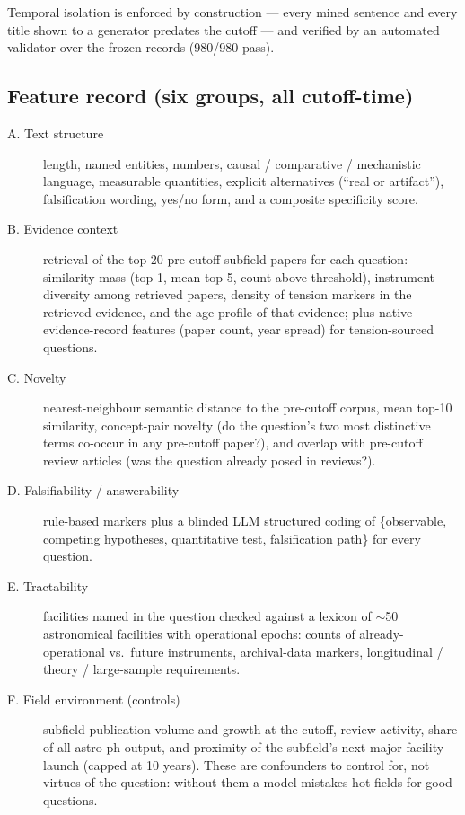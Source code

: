 \documentclass[11pt]{article}
\begin{document}
Temporal isolation is enforced by construction --- every mined sentence
and every title shown to a generator predates the cutoff --- and verified
by an automated validator over the frozen records (980/980 pass).

\subsection{Feature record (six groups, all cutoff-time)}
\label{sec:features}

\begin{description}
  \item[A. Text structure] length, named entities, numbers, causal /
    comparative / mechanistic language, measurable quantities, explicit
    alternatives (``real or artifact''), falsification wording, yes/no
    form, and a composite specificity score.
  \item[B. Evidence context] retrieval of the top-20 pre-cutoff subfield
    papers for each question: similarity mass (top-1, mean top-5, count
    above threshold), instrument diversity among retrieved papers,
    density of tension markers in the retrieved evidence, and the age
    profile of that evidence; plus native evidence-record features
    (paper count, year spread) for tension-sourced questions.
  \item[C. Novelty] nearest-neighbour semantic distance to the
    pre-cutoff corpus, mean top-10 similarity, concept-pair novelty (do
    the question's two most distinctive terms co-occur in any pre-cutoff
    paper?), and overlap with pre-cutoff review articles (was the
    question already posed in reviews?).
  \item[D. Falsifiability / answerability] rule-based markers plus a
    blinded LLM structured coding of \{observable, competing hypotheses,
    quantitative test, falsification path\} for every question.
  \item[E. Tractability] facilities named in the question checked
    against a lexicon of $\sim$50 astronomical facilities with
    operational epochs: counts of already-operational vs.\ future
    instruments, archival-data markers, longitudinal / theory /
    large-sample requirements.
  \item[F. Field environment (controls)] subfield publication volume and
    growth at the cutoff, review activity, share of all astro-ph output,
    and proximity of the subfield's next major facility launch (capped
    at 10 years). These are confounders to control for, not virtues of
    the question: without them a model mistakes hot fields for good
    questions.
\end{description}
\end{document}
